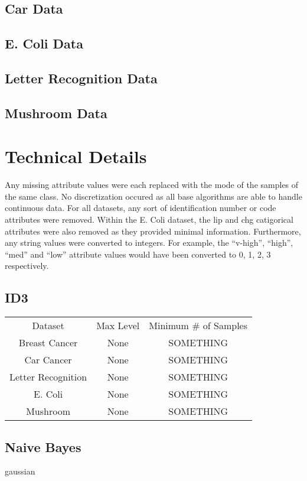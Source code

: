 \documentclass[11pt]{article}
\begin{document}
\subsection{Car Data}
\subsection{E. Coli Data}
\subsection{Letter Recognition Data}
\subsection{Mushroom Data}

\section{Technical Details}
Any missing attribute values were each replaced with the mode of the samples of the same class. No discretization occured as all base algorithms are able to handle continuous data. For all datasets, any sort of identification number or code attributes were removed. Within the E. Coli dataset, the lip and chg catigorical attributes were also removed as they provided minimal information. Furthermore, any string values were converted to integers. For example, the ``v-high'', ``high'', ``med'' and ``low'' attribute values would have been converted to 0, 1, 2, 3 respectively.

\subsection{ID3}
\begin{tabular}{ |c|c|c| }
  Dataset            & Max Level & Minimum # of Samples \\
  Breast Cancer      & None      & SOMETHING            \\
  Car Cancer         & None      & SOMETHING            \\
  Letter Recognition & None      & SOMETHING            \\
  E. Coli            & None      & SOMETHING            \\
  Mushroom           & None      & SOMETHING
\end{tabular}

\subsection{Naive Bayes}
gaussian
\end{document}

